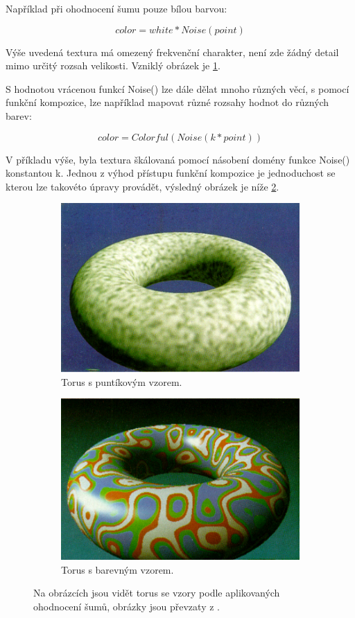 Například při ohodnocení šumu pouze bílou barvou:

\[color = white * Noise(point)\]

Výše uvedená textura má omezený frekvenční charakter, není zde žádný detail mimo určitý rozsah velikosti. Vzniklý obrázek je \ref{SpottedDoughnut}.

S hodnotou vrácenou funkcí Noise() \cite{Perlin2002ImprovingN} lze dále dělat mnoho různých věcí, s pomocí funkční kompozice, lze například mapovat různé rozsahy hodnot do různých barev:

\[color = Colorful(Noise(k * point))\]

V příkladu výše, byla textura škálovaná pomocí násobení domény funkce Noise() konstantou k. Jednou z výhod přístupu funkční kompozice je jednoduchost se kterou lze takovéto úpravy provádět, výsledný obrázek je níže \ref{ColoredDoughnut}.

\begin{figure}[H]
	\centering
	\begin{subfigure}{0.5\textwidth}
		\centering
		\includegraphics[scale=0.475]{obrazky-figures/SpottedDoughnut.png}
		\caption{Torus s puntíkovým vzorem.}
		\label{SpottedDoughnut}
	\end{subfigure}
	\begin{subfigure}{0.4\textwidth}
		\centering
		\includegraphics[scale=0.5]{obrazky-figures/ColoredDoughnut.png}
		\caption{Torus s barevným vzorem.}
		\label{ColoredDoughnut}
	\end{subfigure}
	\caption{Na obrázcích jsou vidět torus se vzory podle aplikovaných ohodnocení šumů, obrázky jsou převzaty z \cite{PerlinKen}.}
	\label{Doughnuts}
\end{figure}

